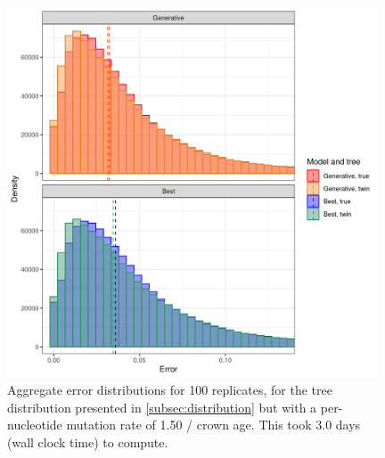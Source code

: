 \begin{figure}[H]
  \includegraphics[width=0.98\textwidth]{pirouette_example_39/errors.png}
  \caption{Aggregate error distributions for 100 replicates,
    for the tree distribution presented 
    in \ref{subsec:distribution} but with a per-nucleotide mutation rate 
    of 1.50 / crown age. 
    This took 3.0 days (wall clock time) to compute.}
  \label{fig:example_1.50_mutation_rate}
\end{figure}

